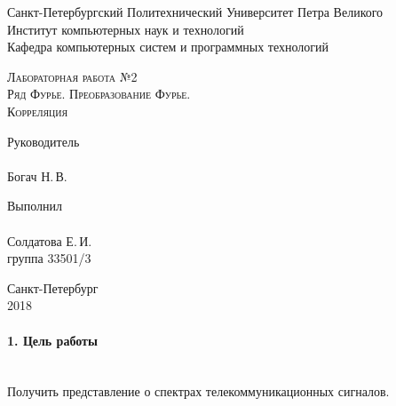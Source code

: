 \documentclass[12pt,a4paper]{report}
\begin{document}
\begin{titlepage}
\newpage
  \begin{center}
     
    Санкт-Петербургский Политехнический Университет Петра Великого \\
    
    Институт компьютерных наук и технологий \\
    
    Кафедра компьютерных систем и программных технологий
    \end{center}
    
    \vspace{15em}
    \begin{center}
    \textsc{Лабораторная работа №2}\\
    \vspace{5mm}
    \textsc{Ряд Фурье. Преобразование Фурье.\\
           Корреляция}
    	
   \end{center}
\vspace{10em}

\newlength{\ML}
\hfill\begin{minipage}{0.45\textwidth}
\vfill
  Руководитель \\
  \\
  \underline{\hspace{\ML}} Богач Н.\,В.\\
 
\end{minipage}%
\bigskip

\hfill\begin{minipage}{0.45\textwidth}
  Выполнил\\
  \\
  \underline{\hspace{\ML}} Солдатова Е.\,И.\\
  группа 33501/3
\end{minipage}%

\vspace{\fill}
\begin{center}
    
  Санкт-Петербург\\
   2018 
\end{center}
\end{titlepage}

\paragraph{1. Цель работы\\\\}
Получить представление о спектрах телекоммуникационных
сигналов.
\end{document}
